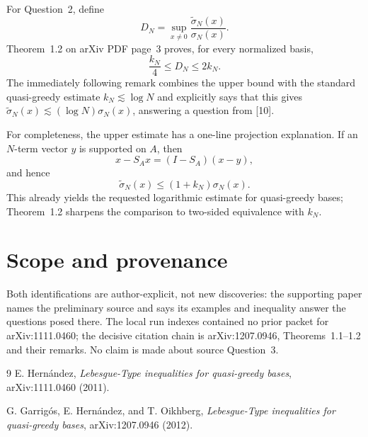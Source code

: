 \documentclass[11pt]{article}
\begin{document}
For Question~2, define
\[
   D_N=\sup_{x\ne0}\frac{\widetilde\sigma_N(x)}{\sigma_N(x)}.
\]
Theorem~1.2 on arXiv PDF page~3 proves, for every normalized basis,
\[
   \frac{k_N}{4}\le D_N\le 2k_N.
\]
The immediately following remark combines the upper bound with the standard
quasi-greedy estimate $k_N\lesssim\log N$ and explicitly says that this gives
$\widetilde\sigma_N(x)\lesssim(\log N)\sigma_N(x)$, answering a question
from [10].

For completeness, the upper estimate has a one-line projection explanation.
If an $N$-term vector $y$ is supported on $A$, then
\[
  x-S_Ax=(I-S_A)(x-y),
\]
and hence
\[
  \widetilde\sigma_N(x)
  \le (1+k_N)\sigma_N(x).
\]
This already yields the requested logarithmic estimate for quasi-greedy
bases; Theorem~1.2 sharpens the comparison to two-sided equivalence with
$k_N$.

\section{Scope and provenance}

Both identifications are author-explicit, not new discoveries: the supporting
paper names the preliminary source and says its examples and inequality answer
the questions posed there.  The local run indexes contained no prior packet
for arXiv:1111.0460; the decisive citation chain is arXiv:1207.0946,
Theorems~1.1--1.2 and their remarks.  No claim is made about source
Question~3.

\begin{thebibliography}{9}
E. Hern\'andez,
\emph{Lebesgue-Type inequalities for quasi-greedy bases},
arXiv:1111.0460 (2011).

G. Garrig\'os, E. Hern\'andez, and T. Oikhberg,
\emph{Lebesgue-Type inequalities for quasi-greedy bases},
arXiv:1207.0946 (2012).
\end{thebibliography}
\end{document}
